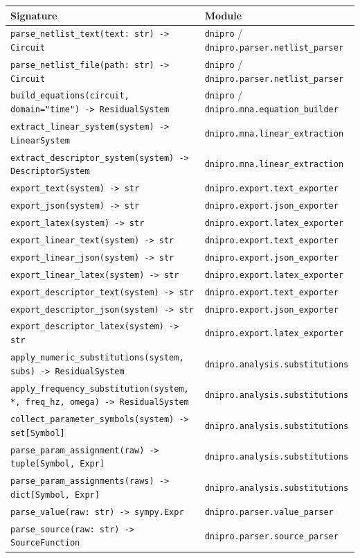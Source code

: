 \documentclass[11pt,a4paper]{article}
\newcommand{\code}[1]{\texttt{#1}}
\begin{document}
\begin{longtable}{p{}p{}}
\toprule
Signature & Module \\
\midrule
\code{parse\_netlist\_text(text: str) -> Circuit}
    & \code{dnipro} / \code{dnipro.parser.netlist\_parser} \\
\code{parse\_netlist\_file(path: str) -> Circuit}
    & \code{dnipro} / \code{dnipro.parser.netlist\_parser} \\
\code{build\_equations(circuit, domain="time") -> ResidualSystem}
    & \code{dnipro} / \code{dnipro.mna.equation\_builder} \\
\code{extract\_linear\_system(system) -> LinearSystem}
    & \code{dnipro.mna.linear\_extraction} \\
\code{extract\_descriptor\_system(system) -> DescriptorSystem}
    & \code{dnipro.mna.linear\_extraction} \\
\code{export\_text(system) -> str}
    & \code{dnipro.export.text\_exporter} \\
\code{export\_json(system) -> str}
    & \code{dnipro.export.json\_exporter} \\
\code{export\_latex(system) -> str}
    & \code{dnipro.export.latex\_exporter} \\
\code{export\_linear\_text(system) -> str}
    & \code{dnipro.export.text\_exporter} \\
\code{export\_linear\_json(system) -> str}
    & \code{dnipro.export.json\_exporter} \\
\code{export\_linear\_latex(system) -> str}
    & \code{dnipro.export.latex\_exporter} \\
\code{export\_descriptor\_text(system) -> str}
    & \code{dnipro.export.text\_exporter} \\
\code{export\_descriptor\_json(system) -> str}
    & \code{dnipro.export.json\_exporter} \\
\code{export\_descriptor\_latex(system) -> str}
    & \code{dnipro.export.latex\_exporter} \\
\code{apply\_numeric\_substitutions(system, subs) -> ResidualSystem}
    & \code{dnipro.analysis.substitutions} \\
\code{apply\_frequency\_substitution(system, *, freq\_hz, omega) -> ResidualSystem}
    & \code{dnipro.analysis.substitutions} \\
\code{collect\_parameter\_symbols(system) -> set[Symbol]}
    & \code{dnipro.analysis.substitutions} \\
\code{parse\_param\_assignment(raw) -> tuple[Symbol, Expr]}
    & \code{dnipro.analysis.substitutions} \\
\code{parse\_param\_assignments(raws) -> dict[Symbol, Expr]}
    & \code{dnipro.analysis.substitutions} \\
\code{parse\_value(raw: str) -> sympy.Expr}
    & \code{dnipro.parser.value\_parser} \\
\code{parse\_source(raw: str) -> SourceFunction}
    & \code{dnipro.parser.source\_parser} \\
\bottomrule
\end{longtable}
\end{document}
